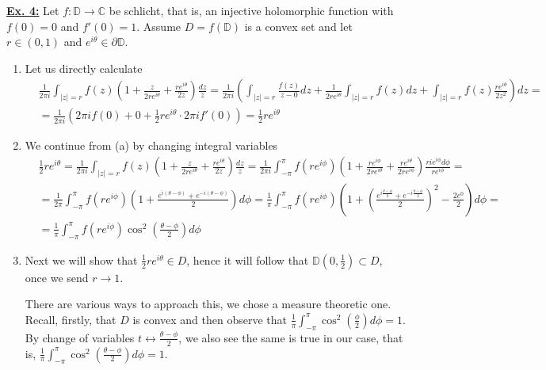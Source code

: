 \documentclass[a4paper, 12pt]{article} %
\newcommand{\D}{\mathbb{D}}
\newcommand{\C}{\mathbb{C}}
\begin{document}
\underline{\textbf{Ex. 4:}}
Let $f \colon \D \to \C$ be schlicht, that is, an injective holomorphic function with $f(0) = 0$ and $f'(0) = 1$. Assume $D = f(\D)$ is a convex set and let $r \in (0, 1)$ and $e^{i\theta} \in \partial\D$.

\begin{enumerate}[label=(\alph*)]
	\item Let us directly calculate
	\begin{align*}
	&\frac{1}{2\pi i} \int_{|z| = r}f(z)\left( 1 + \frac{z}{2re^{i\theta}} + \frac{re^{i\theta}}{2z}\right)\frac{dz}{z} =
	\frac{1}{2\pi i} \left( \int_{|z| = r}\frac{f(z)}{z - 0}dz + \frac{1}{2re^{i\theta}} \int_{|z| = r}f(z)dz + \int_{|z| = r}f(z) \frac{re^{i\theta}}{2z^2} \right)dz = \\
	&=\frac{1}{2\pi i} \left( 2\pi i f(0) + 0 + \frac{1}{2}re^{i\theta}\cdot 2\pi i f'(0) \right) = \frac{1}{2}re^{i\theta}
	\end{align*}
	
	\item We continue from (a) by changing integral variables
	\begin{align*}
	&\frac{1}{2}re^{i\theta} = \frac{1}{2\pi i} \int_{|z| = r}f(z)\left( 1 + \frac{z}{2re^{i\theta}} + \frac{re^{i\theta}}{2z}\right)\frac{dz}{z} =
	\frac{1}{2\pi i} \int_{-\pi}^{\pi}f(re^{i\phi}) \left( 1 + \frac{re^{i\phi}}{2re^{i\theta}} + \frac{re^{i\theta}}{2re^{i\phi}} \right) \frac{rie^{i\phi}d\phi}{re^{i\phi}} = \\
	& =\frac{1}{2\pi} \int_{-\pi}^{\pi}f(re^{i\phi}) \left( 1 + \frac{e^{i(\theta - \phi)} + e^{-i(\theta - \phi)}}{2} \right) d\phi =
	\frac{1}{\pi} \int_{-\pi}^{\pi}f(re^{i\phi}) \left( 1 + \left(\frac{e^{i\frac{\theta - \phi}{2}} + e^{-i\frac{\theta - \phi}{2}}}{2}\right)^2 - \frac{2e^0}{2} \right) d\phi = \\
	& = \frac{1}{\pi} \int_{-\pi}^{\pi}f(re^{i\phi}) \cos^2\left( \frac{\theta - \phi}{2} \right) d\phi
	\end{align*}
	
	\item Next we will show that $\frac{1}{2}re^{i\theta} \in D$, hence it will follow that $\D(0, \frac{1}{2}) \subset D$, once we send $r \to 1$.
	
	There are various ways to approach this, we chose a measure theoretic one. Recall, firstly, that $D$ is convex and then observe that $\frac{1}{\pi} \int_{-\pi}^{\pi}\cos^2\left(\frac{\phi}{2}\right)d\phi = 1$. By change of variables $t \leftrightarrow \frac{\theta - \phi}{2}$, we also see the same is true in our case, that is, $\frac{1}{\pi} \int_{-\pi}^{\pi}\cos^2\left(\frac{\theta - \phi}{2}\right)d\phi = 1$.
	

\end{enumerate}
\end{document}
